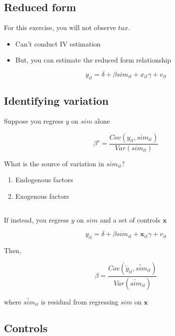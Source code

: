 \documentclass[
  letterpaper,
  DIV=11,
  numbers=noendperiod]{scrartcl}
\begin{document}
\subsection{Reduced form}\label{reduced-form}

For this exercise, you will not observe \(tax\).

\begin{itemize}
\item
  Can't conduct IV estimation
\item
  But, you can estimate the reduced form relationship
\end{itemize}

\[
  y_{it} = \delta + \beta sim_{it} + x_{it}\gamma + v_{it}
\]

\subsection{Identifying variation}\label{identifying-variation}

Suppose you regress \(y\) on \(sim\) alone

\[
  \beta^s = \frac{Cov(y_{it},sim_{it})}{Var(sim_{it})}
\]

What is the source of variation in \(sim_{it}\)?

\begin{enumerate}
\def\labelenumi{\arabic{enumi}.}
\item
  Endogenous factors
\item
  Exogenous factors
\end{enumerate}

\subsection{}\label{section}

If instead, you regress \(y\) on \(sim\) and a set of controls
\(\mathbf{x}\)

\[
  y_{it} = \delta + \beta sim_{it} + \mathbf{x}_{it}\gamma + v_{it}
\]

Then,

\[
    \beta = \frac{Cov(\tilde y_{it},\widetilde{sim}_{it})}{Var(\widetilde{sim}_{it})}
\]

where \(\widetilde{sim}_{it}\) is residual from regressing \(sim\) on
\(\mathbf{x}\)

\subsection{Controls}\label{controls}
\end{document}
